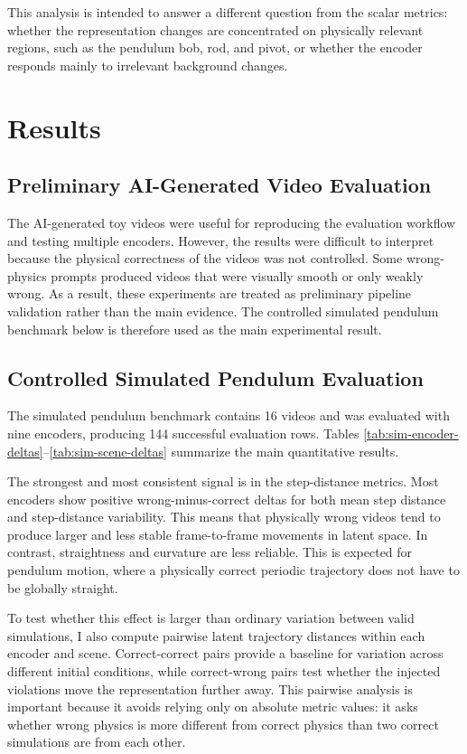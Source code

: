 \documentclass[final-report]{report-template}
\begin{document}
This analysis is intended to answer a different question from the scalar
metrics: whether the representation changes are concentrated on physically
relevant regions, such as the pendulum bob, rod, and pivot, or whether the
encoder responds mainly to irrelevant background changes.

\section{Results}
\subsection{Preliminary AI-Generated Video Evaluation}
The AI-generated toy videos were useful for reproducing the evaluation workflow
and testing multiple encoders. However, the results were difficult to interpret
because the physical correctness of the videos was not controlled. Some
wrong-physics prompts produced videos that were visually smooth or only weakly
wrong. As a result, these experiments are treated as preliminary pipeline
validation rather than the main evidence. The controlled simulated pendulum
benchmark below is therefore used as the main experimental result.

\subsection{Controlled Simulated Pendulum Evaluation}
The simulated pendulum benchmark contains 16 videos and was evaluated with nine
encoders, producing 144 successful evaluation rows. Tables
\ref{tab:sim-encoder-deltas}--\ref{tab:sim-scene-deltas} summarize the main
quantitative results.



The strongest and most consistent signal is in the step-distance metrics. Most
encoders show positive wrong-minus-correct deltas for both mean step distance
and step-distance variability. This means that physically wrong videos tend to
produce larger and less stable frame-to-frame movements in latent space. In
contrast, straightness and curvature are less reliable. This is expected for
pendulum motion, where a physically correct periodic trajectory does not have to
be globally straight.

To test whether this effect is larger than ordinary variation between valid
simulations, I also compute pairwise latent trajectory distances within each
encoder and scene. Correct-correct pairs provide a baseline for variation across
different initial conditions, while correct-wrong pairs test whether the
injected violations move the representation further away. This pairwise
analysis is important because it avoids relying only on absolute metric values:
it asks whether wrong physics is more different from correct physics than two
correct simulations are from each other.
\end{document}
